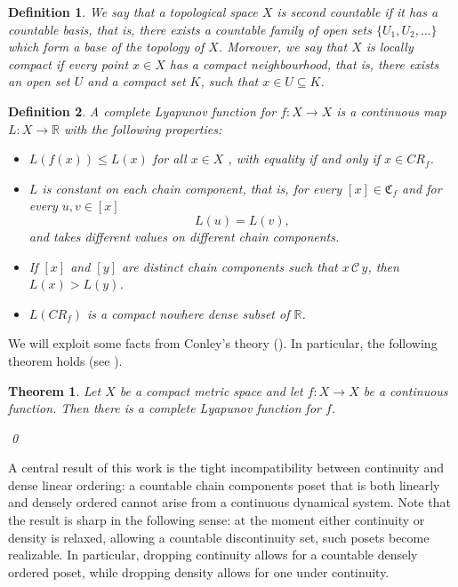 \documentclass[pdflatex,sn-mathphys-num]{sn-jnl}
\theoremstyle{thmstyleone}%
\newtheorem{thm}{Theorem}
\theoremstyle{thmstyletwo}%
\theoremstyle{thmstylethree}%
\newtheorem{defi}{Definition}%
\begin{document}
\begin{defi}\label{def_noncompact}
    We say that a topological space $X$ is \emph{second countable} if it has a countable basis, that is, there exists a countable family of open sets $\{U_1,U_2,\ldots\}$ which form a base of the topology of $X$. 
    Moreover, we say that $X$ is \emph{locally compact} if every point $x\in X$ has a compact neighbourhood, that is, there exists an open set $U$ and a compact set $K$, such that $x\in U\subseteq K$.
\end{defi}
\begin{defi}\label{def_com_Lyap}
A \emph{complete Lyapunov function} for $f:X\rightarrow X$ is a continuous map $L: X \rightarrow \mathbb{R}$
with the following properties:
\begin{itemize}
    \item[(i)] $L(f(x)) \le L(x)$ for all $x\in X$ , with equality if and only if $x\in CR_f$.
    \item[(ii)] $L$ is constant on each chain component, that is, for every $[x]\in \mathfrak{C}_f$ and for every $u,v\in [x]$ 
    $$
    L(u)= L(v),
    $$
    and takes different values on different chain components.
    \item[(iii)] If $[x]$ and $[y]$ are distinct chain components such that $x\,\mathcal{C}\, y$, then $L(x) > L(y)$.
    \item[(iv)] $L(CR_f)$ is a compact nowhere dense subset of $\mathbb{R}$.
\end{itemize}
\end{defi}

\noindent We will exploit some facts from Conley’s theory (\cite{co78, mischaikow}). In particular, the following theorem holds (see \cite[Theorem 4.9]{norton}).
\begin{thm}\label{conley_th}
Let $X$ be a compact metric space
and let $f:X\rightarrow X$ be a continuous function. Then there is a complete Lyapunov function for $f$.

\qed
\end{thm}

\noindent A central result of this work is the tight incompatibility between continuity and dense linear ordering: a countable chain components poset that is both linearly and densely ordered cannot arise from a continuous dynamical system. 
Note that the result is sharp in the following sense: at the moment either continuity or density is relaxed, allowing a countable discontinuity set, such posets become realizable. 
In particular, dropping continuity allows for a countable densely ordered poset, while dropping density allows for one under continuity.
\end{document}
